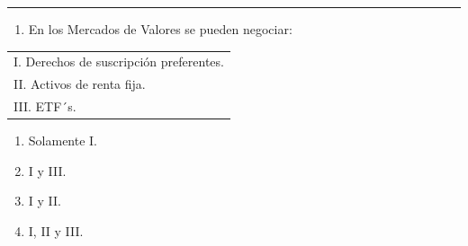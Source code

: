 \documentclass[
  letterpaper,
  DIV=11,
  numbers=noendperiod]{scrreprt}
\providecommand{\tightlist}{%
  \setlength{\itemsep}{0pt}\setlength{\parskip}{0pt}}\usepackage{longtable,booktabs,array}
\begin{document}
\begin{center}\rule{0.5\linewidth}{0.5pt}\end{center}

\begin{enumerate}
\def\labelenumi{\arabic{enumi}.}
\setcounter{enumi}{51}
\tightlist
\item
  En los Mercados de Valores se pueden negociar:
\end{enumerate}

\begin{longtable}[]{@{}l@{}}
\toprule()
\endhead
I. Derechos de suscripción preferentes. \\
II. Activos de renta fija. \\
III. ETF´s. \\
\bottomrule()
\end{longtable}

\begin{enumerate}
\def\labelenumi{\alph{enumi})}
\item
  Solamente I.
\item
  I y III.
\item
  I y II.
\item
  I, II y III.
\end{enumerate}
\end{document}
